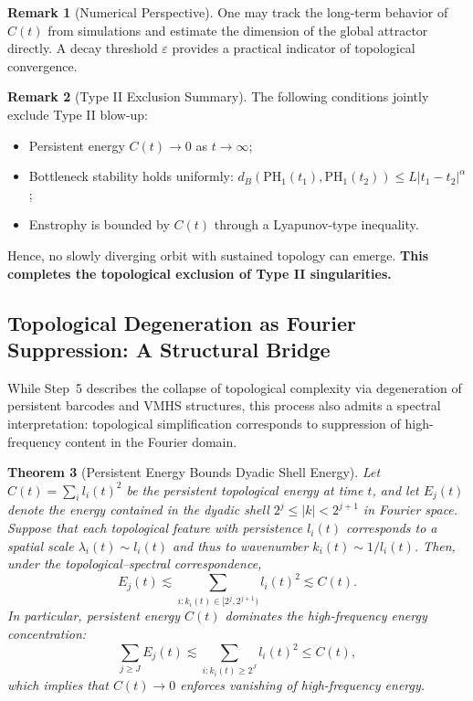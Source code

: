 \documentclass[11pt]{article}
\newtheorem{theorem}{Theorem}[section]
\theoremstyle{definition}
\newtheorem{remark}[theorem]{Remark}
\begin{document}
\begin{remark}[Numerical Perspective]
One may track the long-term behavior of $C(t)$ from simulations and estimate the dimension of the global attractor directly. A decay threshold $\varepsilon$ provides a practical indicator of topological convergence.
\end{remark}

\begin{remark}[Type II Exclusion Summary]
The following conditions jointly exclude Type II blow-up:
\begin{itemize}
  \item Persistent energy $C(t) \to 0$ as $t \to \infty$;
  \item Bottleneck stability holds uniformly: $d_B(\mathrm{PH}_1(t_1), \mathrm{PH}_1(t_2)) \le L|t_1 - t_2|^{\alpha}$;
  \item Enstrophy is bounded by $C(t)$ through a Lyapunov-type inequality.
\end{itemize}
Hence, no slowly diverging orbit with sustained topology can emerge. \textbf{This completes the topological exclusion of Type II singularities.}
\end{remark}

\subsection*{Topological Degeneration as Fourier Suppression: A Structural Bridge}

While Step~5 describes the collapse of topological complexity via degeneration of persistent barcodes and VMHS structures, this process also admits a spectral interpretation: topological simplification corresponds to suppression of high-frequency content in the Fourier domain.

\begin{theorem}[Persistent Energy Bounds Dyadic Shell Energy]
Let $C(t) = \sum_{i} l_i(t)^2$ be the persistent topological energy at time $t$, and let $E_j(t)$ denote the energy contained in the dyadic shell $2^j \le |k| < 2^{j+1}$ in Fourier space. Suppose that each topological feature with persistence $l_i(t)$ corresponds to a spatial scale $\lambda_i(t) \sim l_i(t)$ and thus to wavenumber $k_i(t) \sim 1/l_i(t)$. Then, under the topological–spectral correspondence,
\[
E_j(t) \lesssim \sum_{i : k_i(t) \in [2^j, 2^{j+1})} l_i(t)^2 \lesssim C(t).
\]
In particular, persistent energy $C(t)$ dominates the high-frequency energy concentration:
\[
\sum_{j \ge J} E_j(t) \lesssim \sum_{i : k_i(t) \ge 2^J} l_i(t)^2 \le C(t),
\]
which implies that $C(t) \to 0$ enforces vanishing of high-frequency energy.
\end{theorem}
\end{document}

